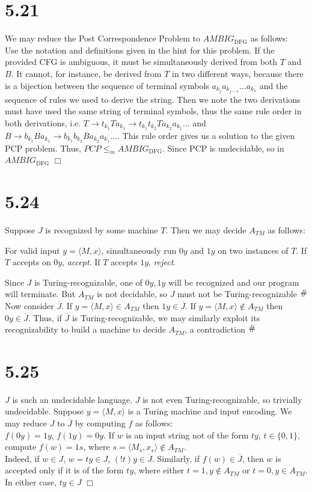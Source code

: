 \documentclass{article}
\newcommand{\contra}{\raisebox{\depth}{\#}}
\newenvironment{myindentpar}[1]
  {\begin{list}{}
          {\setlength{\leftmargin}{#1}
          \setlength{\rightmargin}{#1}}
          \item[]
  }
  {\end{list}}
\begin{document}
\section*{5.21}
We may reduce the Post Correspondence Problem to $AMBIG_{\mathrm{DFG}}$ as follows:\\
Use the notation and definitions given in the hint for this problem. If the provided CFG is ambiguous, it must be simultaneously derived from both $T$ and $B$. It cannot, for instance, be derived from $T$ in two different ways, because there is a bijection between the sequence of terminal symbols $a_{k_j}a_{k_{j-1}}\dots a_{k_1}$ and the sequence of rules we used to derive the string. Then we note the two derivations must have used the same string of terminal symbols, thus the same rule order in both derivations, i.e. $T \to t_{k_1}Ta_{k_1} \to t_{k_1}t_{k_2}Ta_{k_2}a_{k_1} \dots$ and $B \to b_{k_1}Ba_{k_1} \to b_{k_1}b_{k_2}Ba_{k_2}a_{k_1} \dots$. This rule order gives us a solution to the given PCP problem.
Thus, $PCP \leqslant_m AMBIG_{\mathrm{DFG}}$. Since PCP is undecidable, so in $AMBIG_{\mathrm{DFG}}$ $\Box$

\section*{5.24}
Suppose $J$ is recognized by some machine $T$. Then we may decide $A_{TM}$ as follows:
\begin{myindentpar}{1em}
  For valid input $y = \langle M,x \rangle$, simultaneously run $0y$ and $1y$ on two instances of $T$. If $T$ accepts on $0y$, \textit{accept}. If $T$ accepts $1y$, \textit{reject}.
\end{myindentpar}
Since $J$ is Turing-recognizable, one of $0y, 1y$ will be recognized and our program will terminate. But $A_{TM}$ is not decidable, so $J$ must not be Turing-recognizable $\contra$\\
Now consider $\overline{J}$. If $y = \langle M,x \rangle \in A_{TM}$ then $1y \in \overline{J}$. If $y = \langle M,x \rangle \notin A_{TM}$ then $0y \in \overline{J}$. Thus, if $\overline{J}$ is Turing-recognizable, we may similarly exploit its recognizability to build a machine to decide $A_{TM}$, a contradiction $\contra$

\section*{5.25}
$J$ is such an undecidable language. $J$ is not even Turing-recognizable, so trivially undecidable. Suppose $y = \langle M,x \rangle$ is a Turing machine and input encoding. We may reduce $J$ to $\overline{J}$ by computing $f$ as follows:\\
$f(0y) = 1y$, $f(1y) = 0y$. If $w$ is an input string not of the form $ty$, $t \in \{0,1\}$, compute $f(w) = 1s$, where $s = \langle M_s,x_s\rangle \notin A_{TM}$.\\
Indeed, if $w \in J$, $w = ty \in J$, $(!t)y \in \overline{J}$. Similarly, if $f(w) \in \overline{J}$, then $w$ is accepted only if it is of the form $ty$, where either $t = 1, y \notin A_{TM}$ or $t = 0, y \in A_{TM}$. In either case, $ty \in J$ $\Box$
\end{document}
